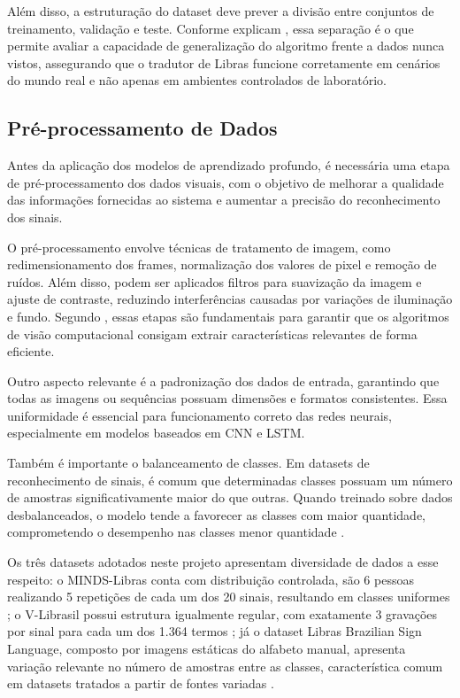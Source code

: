 \documentclass[
    12pt,                %
    openright,           %
    oneside,             %
    a4paper,             %
    english,             %
    brazil               %
]{abntex2}
\begin{document}
Além disso, a estruturação do dataset deve prever a divisão entre conjuntos de treinamento, validação e teste. Conforme explicam , essa separação é o que permite avaliar a capacidade de generalização do algoritmo frente a dados nunca vistos, assegurando que o tradutor de Libras funcione corretamente em cenários do mundo real e não apenas em ambientes controlados de laboratório.

\subsection{Pré-processamento de Dados}

Antes da aplicação dos modelos de aprendizado profundo, é necessária uma etapa de pré-processamento dos dados visuais, com o objetivo de melhorar a qualidade das informações fornecidas ao sistema e aumentar a precisão do reconhecimento dos sinais.

O pré-processamento envolve técnicas de tratamento de imagem, como redimensionamento dos frames, normalização dos valores de pixel e remoção de ruídos. Além disso, podem ser aplicados filtros para suavização da imagem e ajuste de contraste, reduzindo interferências causadas por variações de iluminação e fundo. Segundo , essas etapas são fundamentais para garantir que os algoritmos de visão computacional consigam extrair características relevantes de forma eficiente.

Outro aspecto relevante é a padronização dos dados de entrada, garantindo que todas as imagens ou sequências possuam dimensões e formatos consistentes. Essa uniformidade é essencial para funcionamento correto das redes neurais, especialmente em modelos baseados em CNN e LSTM.

Também é importante o balanceamento de classes. Em datasets de reconhecimento de sinais, é comum que determinadas classes possuam um número de amostras significativamente maior do que outras. Quando treinado sobre dados desbalanceados, o modelo tende a favorecer as classes com maior quantidade, comprometendo o desempenho nas classes menor quantidade \cite{Chawla2002}. 

Os três datasets adotados neste projeto apresentam diversidade de dados a esse respeito: o MINDS-Libras conta com distribuição controlada, são 6 pessoas realizando 5 repetições de cada um dos 20 sinais, resultando em classes uniformes \cite{Rezende2021}; o V-Librasil possui estrutura igualmente regular, com exatamente 3 gravações por sinal para cada um dos 1.364 termos \cite{Rodrigues2021}; já o dataset Libras Brazilian Sign Language, composto por imagens estáticas do alfabeto manual, apresenta variação relevante no número de amostras entre as classes, característica comum em datasets tratados a partir de fontes variadas \cite{Pas2020}. 
\end{document}
